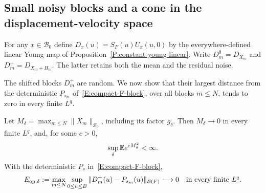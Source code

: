 \subsection{Small noisy blocks and a cone in the displacement-velocity space}

For any $x \in \mathscr{B}_0$ define $D_x(u) = S_F(u)U_x(u,0)$ by the
everywhere-defined linear Young map of
Proposition~\ref{P:constant-young-linear}. Write $D_m^0 = D_{X_m}$ and $D_m^+ =
D_{X_m+H_m}$. The latter retains both the mean and the residual noise.

The shifted blocks $D_m^+$ are random. We now show that their largest distance
from the deterministic $P_{s_m}$ of~\eqref{E:compact-F-block}, over all blocks
$m \le N$, tends to zero in every finite $L^q$.

\begin{lemma}\label{L:raw-block-uniform-error}
  Let $M_\delta = \max_{m\le N}\|X_m\|_{\mathscr{B}_0}$, including its factor
  $g_\delta$. Then $M_\delta \to 0$ in every finite $L^q$, and, for some $c >
  0$,
  \begin{equation}\label{E:raw-block-maximum-exponential}
    \sup_\delta\mathbb{E} e^{cM_\delta^2}<\infty.
  \end{equation}
  With the deterministic $P_s$ in~\eqref{E:compact-F-block},
  \begin{equation}\label{E:raw-block-operator-error}
    E_{\mathrm{op},\delta}:=
    \max_{m\le N}\sup_{0\le u\le B}
    \|D_m^+(u)-P_{s_m}(u)\|_{\mathcal{B}(F)}
    \longrightarrow0
    \quad\hbox{in every finite }L^q.
  \end{equation}
\end{lemma}

